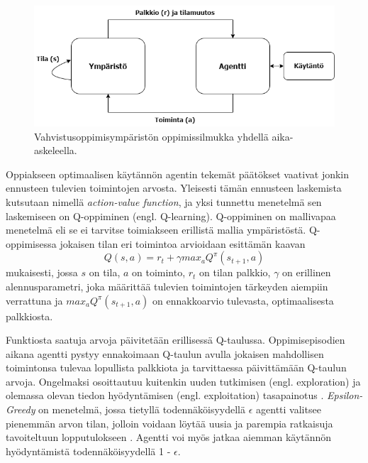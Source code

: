 \documentclass[utf8]{gradu3}
\begin{document}
\begin{figure}[h]
\centering
\includegraphics[width=13.5cm]{reinflearning.png}
\caption{Vahvistusoppimisympäristön oppimissilmukka yhdellä aika-askeleella.}
\label{reinflearning}
\end{figure}

Oppiakseen optimaalisen käytännön agentin tekemät päätökset vaativat jonkin ennusteen tulevien toimintojen arvosta. Yleisesti tämän ennusteen laskemista kutsutaan nimellä \textit{action-value function}, ja yksi tunnettu menetelmä sen laskemiseen on Q-oppiminen (engl. Q-lear\-ning). Q-oppiminen on mallivapaa menetelmä eli se ei tarvitse toimiakseen erillistä mallia ympäristöstä. Q-oppimisessa jokaisen tilan eri toimintoa arvioidaan \textcite{arulkumaran2017brief} esittämän kaavan \[Q(s,a) = r_t + \gamma max_a Q^\pi (s_{t+1},a)\] mukaisesti, jossa \(s\) on tila, \(a\) on toiminto, \(r_t\) on tilan palkkio, $\gamma$ on erillinen alennusparametri, joka määrittää tulevien toimintojen tärkeyden aiempiin verrattuna ja \(max_a Q^\pi (s_{t+1},a)\) on ennakkoarvio tulevasta, optimaalisesta palkkiosta.

Funktiosta saatuja arvoja päivitetään erillisessä Q-taulussa. Oppimisepisodien aikana agentti pystyy ennakoimaan Q-taulun avulla jokaisen mahdollisen toimintonsa tulevaa lopullista palkkiota ja tarvittaessa päivittämään Q-taulun arvoja. Ongelmaksi osoittautuu kuitenkin uuden tutkimisen (engl. exploration) ja olemassa olevan tiedon hyödyntämisen (engl. exploitation) tasapainotus \parencite{arulkumaran2017brief}. \textit{Epsilon-Greedy} on menetelmä, jossa tietyllä todennäköisyydellä $\epsilon$ agentti valitsee pienemmän arvon tilan, jolloin voidaan löytää uusia ja parempia ratkaisuja tavoiteltuun lopputulokseen \parencite{li2018deep,panov2018grid}. Agentti voi myös jatkaa aiemman käytännön hyödyntämistä todennäköisyydellä 1 - $\epsilon$.
\end{document}

